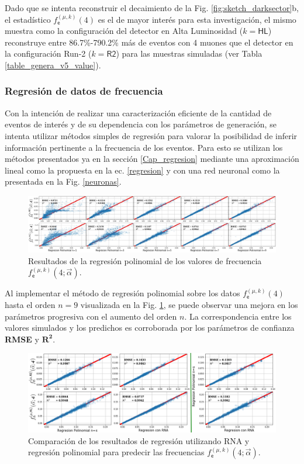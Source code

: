 Dado que se intenta reconstruir el decaimiento de la Fig. \ref{fig:sketch_darksector}b, el estadístico $f^{(\mu, k)}_\textsf{e} (4)$ es el de mayor interés para esta investigación, el mismo muestra como la configuración del detector en Alta Luminosidad ($k=\textsf{HL}$) reconstruye entre 86.7\%-790.2\% más de eventos con 4 muones que el detector en la configuración Run-2 ($k=\textsf{R2}$) para las muestras simuladas (ver Tabla \ref{table_genera_v5_value}).





\subsubsection{Regresión de datos de frecuencia}

Con la intención de realizar una caracterización eficiente de la cantidad de eventos de interés y de su dependencia con los parámetros de generación, se intenta utilizar métodos simples de regresión para valorar la posibilidad de inferir información pertinente a la frecuencia de los eventos. Para esto se utilizan los métodos presentados ya en la sección \ref{Cap_regresion} mediante una aproximación lineal como la propuesta en la ec. \ref{regresion} y con una red neuronal como la presentada en la Fig. \ref{neuronas}.

\begin{figure}[!ht]
\centering
\includegraphics[width=1\textwidth]{Simulacion/imagenes/ML_Entries3.png}
\caption{Resultados de la regresión polinomial de los valores de frecuencia $f^{(\mu, k)}_\textsf{e} (4;\vec{\alpha})$.}
\label{regresionALL}
\end{figure}


Al implementar el método de regresión polinomial sobre los datos $f^{(\mu, k)}_\textsf{e} (4)$ hasta el orden $n = 9$ visualizada en la Fig. \ref{regresionALL}, se puede observar una mejora en los parámetros progresiva con el aumento del orden $n$. La correspondencia entre los valores simulados y los predichos es corroborada por los parámetros de confianza \textbf{RMSE} y $\mathbf{R^2}$. 
\begin{figure}[!ht]
\centering
\includegraphics[width=.9\textwidth]{Simulacion/imagenes/ML_Entries.png}
\caption{Comparación de los resultados de regresión utilizando RNA y regresión polinomial para predecir las frecuencias $f^{(\mu, k)}_\textsf{e} (4; \vec{\alpha})$.}
\label{regresionALL1}
\end{figure}

